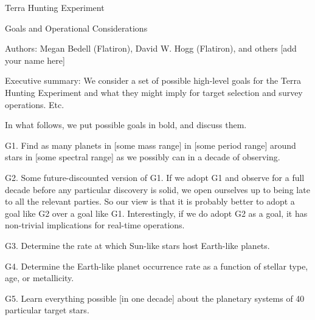 \documentclass[12pt, letterpaper]{article}
\begin{document}
﻿Terra Hunting Experiment

Goals and Operational Considerations

Authors: Megan Bedell (Flatiron), David W. Hogg (Flatiron), and others [add your name here]

Executive summary: We consider a set of possible high-level goals for the Terra Hunting Experiment and what they might imply for target selection and survey operations. Etc.

In what follows, we put possible goals in bold, and discuss them.

G1. Find as many planets in [some mass range] in [some period range] around stars in [some spectral range] as we possibly can in a decade of observing.

G2. Some future-discounted version of G1. If we adopt G1 and observe for a full decade before any particular discovery is solid, we open ourselves up to being late to all the relevant parties. So our view is that it is probably better to adopt a goal like G2 over a goal like G1. Interestingly, if we do adopt G2 as a goal, it has non-trivial implications for real-time operations.

G3. Determine the rate at which Sun-like stars host Earth-like planets.

G4. Determine the Earth-like planet occurrence rate as a function of stellar type, age, or metallicity.

G5. Learn everything possible [in one decade] about the planetary systems of 40 particular target stars.
\end{document}
